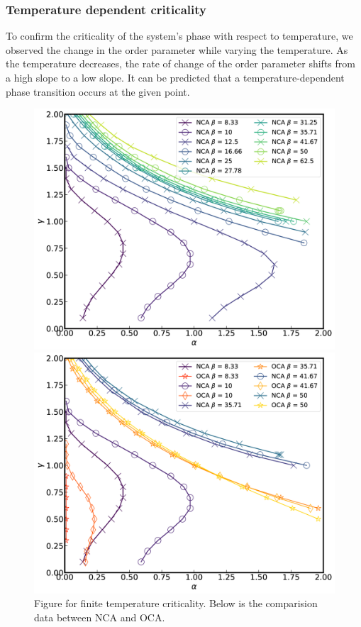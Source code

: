 \documentclass{article}[12pt]
\begin{document}
\begin{spacing}{1.5}
\subsubsection*{Temperature dependent criticality}
To confirm the criticality of the system's phase with respect to temperature, 
we observed the change in the order parameter while varying the temperature. As the temperature decreases, 
the rate of change of the order parameter shifts from a high slope to a low slope. 
It can be predicted that a temperature-dependent phase transition occurs at the given point.
\begin{figure}[htbp]
  \centerline{\includegraphics[width=12cm]{TexFigure/3dplot_Ns3_proj_n (2).png}}
  \centerline{\includegraphics[width=12cm]{TexFigure/3dplot_COMP3_proj_n (2).png}}
  \caption{Figure for finite temperature criticality. Below is the comparision data between NCA and OCA.}

\end{figure}
\end{spacing}
\end{document}
